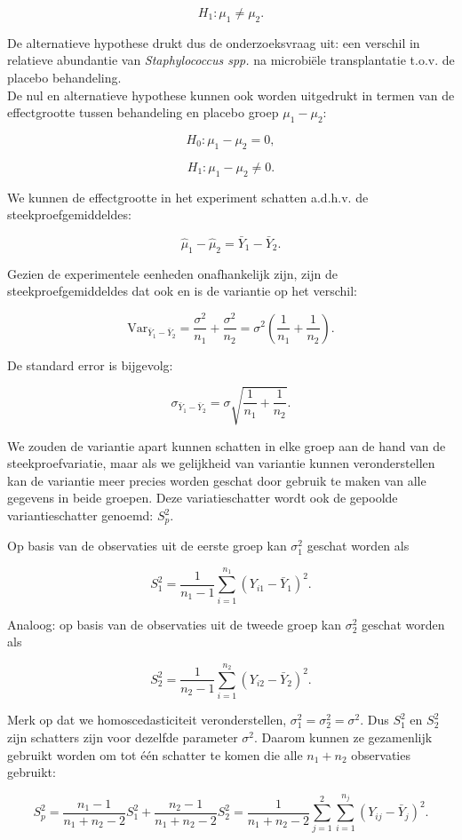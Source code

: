 \documentclass[
  12pt,dutch,coursenotes]{book}
\begin{document}
\[  H_1: \mu_1 \neq \mu_2 .\]

De alternatieve hypothese drukt dus de onderzoeksvraag uit: een verschil in relatieve abundantie van \emph{Staphylococcus spp.} na microbiële transplantatie t.o.v. de placebo behandeling.\\
De nul en alternatieve hypothese kunnen ook worden uitgedrukt in termen van de effectgrootte tussen behandeling en placebo groep \(\mu_1-\mu_2\):

\[H_0: \mu_1-\mu_2 = 0,\]

\[H_1: \mu_1-\mu_2 \neq 0.\]

We kunnen de effectgrootte in het experiment schatten a.d.h.v. de steekproefgemiddeldes:

\[\hat \mu_1-\hat \mu_2=\bar Y_1 -\bar Y_2.\]

Gezien de experimentele eenheden onafhankelijk zijn, zijn de steekproefgemiddeldes dat ook en is de variantie op het verschil:

\[\text{Var}_{\bar Y_1 -\bar Y_2}=\frac{\sigma^2}{n_1}+\frac{\sigma^2}{n_2}=\sigma^2 \left(\frac{1}{n_1}+\frac{1}{n_2}\right).\]

De standard error is bijgevolg:

\[\sigma_{\bar Y_1 -\bar Y_2}=\sigma\sqrt{\frac{1}{n_1}+\frac{1}{n_2}}.\]

We zouden de variantie apart kunnen schatten in elke groep aan de hand van de steekproefvariatie, maar als we gelijkheid van variantie kunnen veronderstellen kan de variantie meer precies worden geschat door gebruik te maken van alle gegevens in beide groepen.
Deze variatieschatter wordt ook de gepoolde variantieschatter genoemd: \(S^2_p\).

Op basis van de observaties uit de eerste groep kan \(\sigma^2_1\) geschat worden als

\[S_1^2 = \frac{1}{n_1-1}\sum_{i=1}^{n_1} (Y_{i1}-\bar{Y}_1)^2.\]

Analoog: op basis van de observaties uit de tweede groep kan \(\sigma^2_2\) geschat worden als

\[S_2^2 = \frac{1}{n_2-1}\sum_{i=1}^{n_2} (Y_{i2}-\bar{Y}_2)^2.\]

Merk op dat we homoscedasticiteit veronderstellen, \(\sigma_1^2=\sigma_2^2=\sigma^2\). Dus \(S_1^2\) en \(S_2^2\) zijn schatters zijn voor dezelfde parameter \(\sigma^2\). Daarom kunnen ze gezamenlijk gebruikt worden om tot één schatter te komen die alle \(n_1+n_2\) observaties gebruikt:

\[  S_p^2 = \frac{n_1-1}{n_1+n_2-2} S_1^2 + \frac{n_2-1}{n_1+n_2-2} S_2^2 = \frac{1}{n_1+n_2-2}\sum_{j=1}^2\sum_{i=1}^{n_j} (Y_{ij} - \bar{Y}_j)^2.\]
\end{document}
